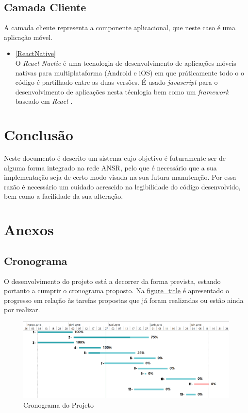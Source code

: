 \documentclass{article}
\begin{document}
\hypertarget{_camada_cliente}{%
\subsection{Camada Cliente}\label{_camada_cliente}}

A camada cliente representa a componente aplicacional, que neste caso é
uma aplicação móvel.

\begin{itemize}
\item
  \protect\hyperlink{ReactNative}{{[}ReactNative{]}}\\
  O \emph{React Navtie} é uma tecnologia de desenvolvimento de
  aplicações móveis nativas para multiplataforma (Android e iOS) em que
  práticamente todo o o código é partilhado entre as duas versões. É
  usado \emph{javascript} para o desenvolvimento de aplicações nesta
  técnlogia bem como um \emph{framework} baseado em \emph{React} .
\end{itemize}

\hypertarget{_conclus_o}{%
\section{Conclusão}\label{_conclus_o}}

Neste documento é descrito um sistema cujo objetivo é futuramente ser de
alguma forma integrado na rede ANSR, pelo que é necessário que a sua
implementação seja de certo modo visada na sua futura manutenção. Por
essa razão é necessário um cuidado acrescido na legibilidade do código
desenvolvido, bem como a facilidade da sua alteração.

\hypertarget{_anexos}{%
\section{Anexos}\label{_anexos}}

\hypertarget{_cronograma}{%
\subsection{Cronograma}\label{_cronograma}}

O desenvolvimento do projeto está a decorrer da forma prevista, estando
portanto a cumprir o cronograma proposto. Na
\protect\hyperlink{cronograma}{figure\_title} é apresentado o progresso
em relação às tarefas propostas que já foram realizadas ou estão ainda
por realizar.

\begin{figure}
\centering
\includegraphics[scale=0.22]{./adoc_images/cronograma_dates.png}
\caption{Cronograma do Projeto}
\end{figure}
\end{document}
